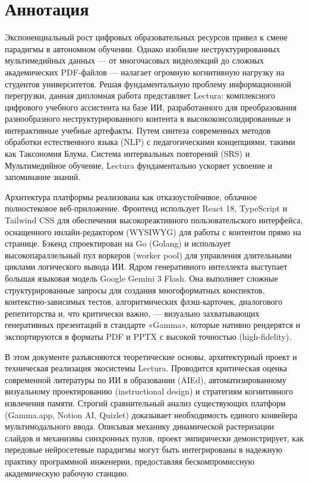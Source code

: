 \chapter*{Аннотация}
\begin{SingleSpace}
Экспоненциальный рост цифровых образовательных ресурсов привел к смене парадигмы в автономном обучении. Однако изобилие неструктурированных мультимедийных данных — от многочасовых видеолекций до сложных академических PDF-файлов — налагает огромную когнитивную нагрузку на студентов университетов. Решая фундаментальную проблему информационной перегрузки, данная дипломная работа представляет Lectura: комплексного цифрового учебного ассистента на базе ИИ, разработанного для преобразования разнообразного неструктурированного контента в высококонсолидированные и интерактивные учебные артефакты. Путем синтеза современных методов обработки естественного языка (NLP) с педагогическими концепциями, такими как Таксономия Блума, Система интервальных повторений (SRS) и Мультимедийное обучение, Lectura фундаментально ускоряет усвоение и запоминание знаний.

Архитектура платформы реализована как отказоустойчивое, облачное полностековое веб-приложение. Фронтенд использует React 18, TypeScript и Tailwind CSS для обеспечения высокореактивного пользовательского интерфейса, оснащенного инлайн-редактором (WYSIWYG) для работы с контентом прямо на странице. Бэкенд спроектирован на Go (Golang) и использует высокопараллельный пул воркеров (worker pool) для управления длительными циклами логического вывода ИИ. Ядром генеративного интеллекта выступает большая языковая модель Google Gemini 3 Flash. Она выполняет сложные структурированные запросы для создания многоформатных конспектов, контекстно-зависимых тестов, алгоритмических флэш-карточек, диалогового репетиторства и, что критически важно, — визуально захватывающих генеративных презентаций в стандарте «Gamma», которые нативно рендерятся и экспортируются в форматы PDF и PPTX с высокой точностью (high-fidelity).

В этом документе разъясняются теоретические основы, архитектурный проект и техническая реализация экосистемы Lectura. Проводится критическая оценка современной литературы по ИИ в образовании (AIEd), автоматизированному визуальному проектированию (instructional design) и стратегиям когнитивного извлечения памяти. Строгий сравнительный анализ существующих платформ (Gamma.app, Notion AI, Quizlet) доказывает необходимость единого конвейера мультимодального ввода. Описывая механику динамической растеризации слайдов и механизмы синхронных пулов, проект эмпирически демонстрирует, как передовые нейросетевые парадигмы могут быть интегрированы в надежную практику программной инженерии, предоставляя бескомпромиссную академическую рабочую станцию.
\end{SingleSpace}
